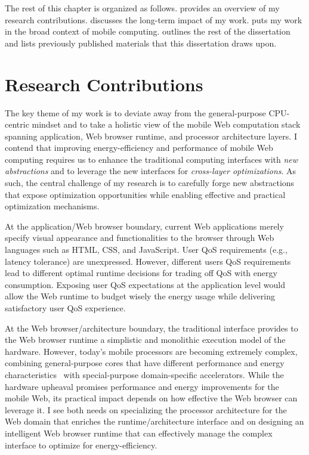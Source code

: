 The rest of this chapter is organized as follows.  provides an overview of my research contributions.  discusses the long-term impact of my work.  puts my work in the broad context of mobile computing.  outlines the rest of the dissertation and  lists previously published materials that this dissertation draws upon.

\section{Research Contributions}
\label{sec:intro:work}

The key theme of my work is to deviate away from the general-purpose CPU-centric mindset and to take a holistic view of the mobile Web computation stack spanning application, Web browser runtime, and processor architecture layers. I contend that improving energy-efficiency and performance of mobile Web computing requires us to enhance the traditional computing interfaces with \textit{new abstractions} and to leverage the new interfaces for \textit{cross-layer optimizations}. As such, the central challenge of my research is to carefully forge new abstractions that expose optimization opportunities while enabling effective and practical optimization mechanisms.

At the application/Web browser boundary, current Web applications merely specify visual appearance and functionalities to the browser through Web languages such as HTML, CSS, and JavaScript. User QoS requirements (e.g., latency tolerance) are unexpressed. However, different users QoS requirements lead to different optimal runtime decisions for trading off QoS with energy consumption. Exposing user QoS expectations at the application level would allow the Web runtime to budget wisely the energy usage while delivering satisfactory user QoS experience.

At the Web browser/architecture boundary, the traditional interface provides to the Web browser runtime a simplistic and monolithic execution model of the hardware. However, today's mobile processors are becoming extremely complex, combining general-purpose cores that have different performance and energy characteristics~\cite{single-ISA} with special-purpose domain-specific accelerators. While the hardware upheaval promises performance and energy improvements for the mobile Web, its practical impact depends on how effective the Web browser can leverage it. I see both needs on specializing the processor architecture for the Web domain that enriches the runtime/architecture interface and on designing an intelligent Web browser runtime that can effectively manage the complex interface to optimize for energy-efficiency.

